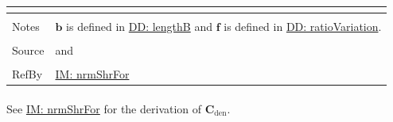 \documentclass[12pt]{article}
\begin{document}
\begin{minipage}{\textwidth}
\begin{tabular}{>{\raggedright}p{}>{\raggedright\arraybackslash}p{}}
\begin{symbDescription}
              \end{symbDescription}
\\ \midrule \\
Notes & $\mathbf{b}$ is defined in \hyperref[DD:lengthB]{DD: lengthB} and $\mathbf{f}$ is defined in \hyperref[DD:ratioVariation]{DD: ratioVariation}.
\\ \midrule \\
Source & \cite{chen2005} and \cite{karchewski2012}
\\ \midrule \\
RefBy & \hyperref[IM:nrmShrFor]{IM: nrmShrFor}
\\ \bottomrule
\end{tabular}
\end{minipage}
\paragraph{}
\label{IM:nrmShrForDenDeriv}
See \hyperref[IM:nrmShrFor]{IM: nrmShrFor} for the derivation of ${\mathbf{C}_{\text{den}}}$.
\par~
\end{document}
